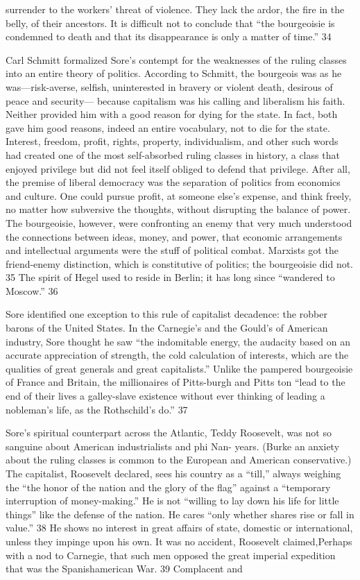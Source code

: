 surrender to the workers’ threat of violence. They lack the ardor, the fire in the belly, of their ancestors. It is difficult not to conclude that “the bourgeoisie is condemned to death and that its disappearance is only a matter of time.” {\color{blue} 34 } {\par} Carl Schmitt formalized Sore’s contempt for the weaknesses of the ruling classes into an entire theory of politics. According to Schmitt, the bourgeois was as he was—risk-averse, selfish, uninterested in bravery or violent death, desirous of peace and security— because capitalism was his calling and liberalism his faith. Neither provided him with a good reason for dying for the state. In fact, both gave him good reasons, indeed an entire vocabulary, not to die for the state. Interest, freedom, profit, rights, property, individualism, and other such words had created one of the most self-absorbed ruling classes in history, a class that enjoyed privilege but did not feel itself obliged to defend that privilege. After all, the premise of liberal democracy was the separation of politics from economics and culture. One could pursue profit, at someone else’s expense, and think freely, no matter how subversive the thoughts, without disrupting the balance of power. The bourgeoisie, however, were confronting an enemy that very much understood the connections between ideas, money, and power, that economic arrangements and intellectual arguments were the stuff of political combat. Marxists got the friend-enemy distinction, which is constitutive of politics; the bourgeoisie did not. {\color{blue} 35 } The spirit of Hegel used to reside in Berlin; it has long since “wandered to Moscow.” {\color{blue} 36 } {\par} Sore identified one exception to this rule of capitalist decadence: the robber barons of the United States. In the Carnegie's and the Gould's of American industry, Sore thought he saw “the indomitable energy, the audacity based on an accurate appreciation of strength, the cold calculation of interests, which are the qualities of great generals and great capitalists.” Unlike the pampered bourgeoisie of France and Britain, the millionaires of Pitts-burgh and Pitts ton “lead to the end of their lives a galley-slave existence without ever thinking of leading a nobleman’s life, as the Rothschild's do.” {\color{blue} 37 } {\par} Sore’s spiritual counterpart across the Atlantic, Teddy Roosevelt, was not so sanguine about American industrialists and phi Nan- years. (Burke an anxiety about the ruling classes is common to the European and American conservative.) The capitalist, Roosevelt declared, sees his country as a “till,” always weighing the “the honor of the nation and the glory of the flag” against a “temporary interruption of money-making.” He is not “willing to lay down his life for little things” like the defense of the nation. He cares “only whether shares rise or fall in value.” {\color{blue} 38 } He shows no interest in great affairs of state, domestic or international, unless they impinge upon his own. It was no accident, Roosevelt claimed,Perhaps with a nod to Carnegie, that such men opposed the great imperial expedition that was the Spanishamerican War. {\color{blue} 39 } Complacent and 